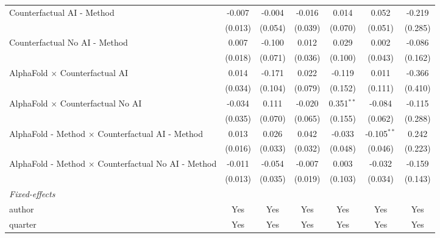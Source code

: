 \begin{tabular}{lcccccc}
   Counterfactual AI - Method                                 & -0.007       & -0.004  & -0.016       & 0.014        & 0.052         & -0.219\\   
                                                              & (0.013)      & (0.054) & (0.039)      & (0.070)      & (0.051)       & (0.285)\\   
   Counterfactual No AI - Method                              & 0.007        & -0.100  & 0.012        & 0.029        & 0.002         & -0.086\\   
                                                              & (0.018)      & (0.071) & (0.036)      & (0.100)      & (0.043)       & (0.162)\\   
   AlphaFold $\times$ Counterfactual AI                       & 0.014        & -0.171  & 0.022        & -0.119       & 0.011         & -0.366\\   
                                                              & (0.034)      & (0.104) & (0.079)      & (0.152)      & (0.111)       & (0.410)\\   
   AlphaFold $\times$ Counterfactual No AI                    & -0.034       & 0.111   & -0.020       & 0.351$^{**}$ & -0.084        & -0.115\\   
                                                              & (0.035)      & (0.070) & (0.065)      & (0.155)      & (0.062)       & (0.288)\\   
   AlphaFold - Method $\times$ Counterfactual AI - Method     & 0.013        & 0.026   & 0.042        & -0.033       & -0.105$^{**}$ & 0.242\\   
                                                              & (0.016)      & (0.033) & (0.032)      & (0.048)      & (0.046)       & (0.223)\\   
   AlphaFold - Method $\times$ Counterfactual No AI - Method  & -0.011       & -0.054  & -0.007       & 0.003        & -0.032        & -0.159\\   
                                                              & (0.013)      & (0.035) & (0.019)      & (0.103)      & (0.034)       & (0.143)\\   
   \midrule
   \emph{Fixed-effects}\\
   author                                                     & Yes          & Yes     & Yes          & Yes          & Yes           & Yes\\  
   quarter                                                    & Yes          & Yes     & Yes          & Yes          & Yes           & Yes\\  

\end{tabular}
